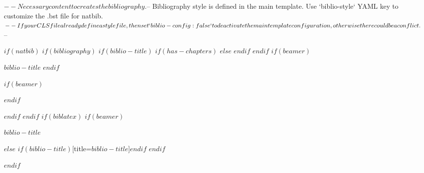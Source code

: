 $-- Necessary content to creates the bibliography.
$-- Bibliography style is defined in the main template. Use `biblio-style` YAML key to customize the .bst file for natbib.
$-- If your CLS file already define a style file, then set `biblio-config: false` to deactivate the main template configuration, otherwise there could be a conflict.
$--

$if(natbib)$
$if(bibliography)$
$if(biblio-title)$
$if(has-chapters)$
\renewcommand\bibname{$biblio-title$}
$else$
\renewcommand\refname{$biblio-title$}
$endif$
$endif$
$if(beamer)$
\begin{frame}[allowframebreaks]{$biblio-title$}
  \bibliographytrue
$endif$
  
$if(beamer)$
\end{frame}
$endif$

$endif$
$endif$
$if(biblatex)$
$if(beamer)$
\begin{frame}[allowframebreaks]{$biblio-title$}
  \bibliographytrue
  \printbibliography[heading=none]
\end{frame}
$else$
\printbibliography$if(biblio-title)$[title=$biblio-title$]$endif$
$endif$

$endif$